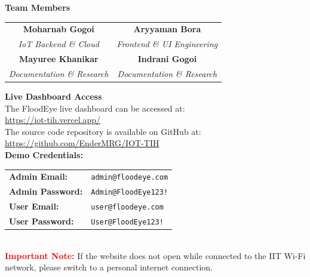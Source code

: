 \begin{titlepage}
\vfill

\begin{center}
  {\Large\bfseries\color{FloodBlue!80!black} Team Members}\\[0.5cm]
  \renewcommand{\arraystretch}{1.2}
  \setlength{\tabcolsep}{1.5cm}
  \begin{tabular}{cc}
    \textcolor{FloodBlue}{\textbf{\large Moharnab Gogoi}}
      & \textcolor{FloodBlue}{\textbf{\large Aryyaman Bora}} \\
    \textcolor{FloodGray}{\itshape IoT Backend \& Cloud}
      & \textcolor{FloodGray}{\itshape Frontend \& UI Engineering} \\[0.4cm]
    \textcolor{FloodBlue}{\textbf{\large Mayuree Khanikar}}
      & \textcolor{FloodBlue}{\textbf{\large Indrani Gogoi}} \\
    \textcolor{FloodGray}{\itshape Documentation \& Research}
      & \textcolor{FloodGray}{\itshape Documentation \& Research} \\
  \end{tabular}
\end{center}

\restoregeometry
\end{titlepage}
\clearpage

\thispagestyle{empty}
\vspace*{5cm}
\begin{center}
  {\Large\bfseries\color{FloodBlue!80!black} Live Dashboard Access}\\[0.8cm]
  
  The FloodEye live dashboard can be accessed at:\\[0.3cm]
  \Large \url{https://iot-tih.vercel.app/}\\[0.6cm]
  
  \normalsize
  The source code repository is available on GitHub at:\\[0.3cm]
  \Large \url{https://github.com/EnderMRG/IOT-TIH}\\[1cm]
  
  \normalsize
  \textbf{Demo Credentials:}\\[0.4cm]
  \renewcommand{\arraystretch}{1.5}
  \begin{tabular}{>{\bfseries}l l}
    Admin Email: & \texttt{admin@floodeye.com} \\
    Admin Password: & \texttt{Admin@FloodEye123!} \\[0.3cm]
    User Email: & \texttt{user@floodeye.com} \\
    User Password: & \texttt{User@FloodEye123!} \\
  \end{tabular}\\[1.5cm]
  
  \textcolor{red}{\textbf{Important Note:}} If the website does not open while connected to the IIT Wi-Fi network, please switch to a personal internet connection.
\end{center}
\clearpage
